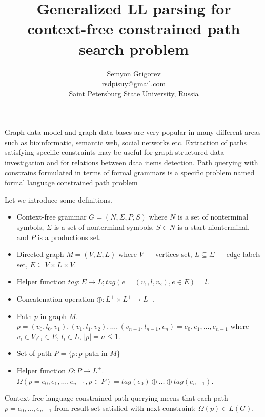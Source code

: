 \documentclass{sig-alternate} %
\begin{document}
\makeatletter
\def\@copyrightspace{\relax}
\makeatother

\title{Generalized LL parsing for context-free constrained path search problem}

\sloppy

\author{Semyon Grigorev\\
rsdpisuy@gmail.com\\
Saint Petersburg State University, Russia}

\maketitle

Graph data model and graph data bases are very popular in many different areas such as bioinformatic, semantic web, social networks etc.
Extraction of paths satisfying specific constraints may be useful for graph structured data investigation and for relations between data items detection.
Path querying with constrains formulated in terms of formal grammars is a specific problem named formal language constrained path problem~\cite{FLCpathProblem} 
~\cite{DirOfBigGraphAnalysis}

Let we introduce some definitions.
\begin{itemize}
  \item Context-free grammar $G=(N, \Sigma, P, S)$ where $N$ is a set of nonterminal symbols, $\Sigma$ is a set of nonterminal symbols, $S \in N$ is a start nionterminal, and $P$ is a productions set. 
  \item Directed graph $M = (V,E,L)$ where $V$ --- vertices set, $L \subseteq \Sigma$ --- edge labels set, $E\subseteq V\times L\times V$.
  \item Helper function $tag: E \rightarrow L; tag(e = (v_1,l,v_2), e \in E) = l$.
  \item Concatenation operation $\oplus: L^+ \times L^+ \rightarrow L^+$.
  \item Path $p$ in graph $M$. \\ $p = (v_0,l_0,v_1),(v_1,l_1,v_2),\dots,(v_{n-1},l_{n-1},v_n) = e_0,e_1,\dots,e_{n-1}$ where $v_i \in V$,$e_i \in E$, $l_i \in L$, $|p| = n \leq 1$. 
  \item Set of path $P = \{p: p \text{ path in } M\}$
  \item Helper function $\Omega: P \rightarrow L^+$.\\ $\Omega(p = e_0,e_1,\dots,e_{n-1}, p \in P) = tag (e_0) \oplus \dots \oplus tag (e_{n-1})$.
\end{itemize}
Context-free language constrained path querying meens that each path $p = e_0,\dots,e_{n-1}$ from result set satisfied with next constraint: $\Omega(p) \in L(G)$. 
\end{document}
